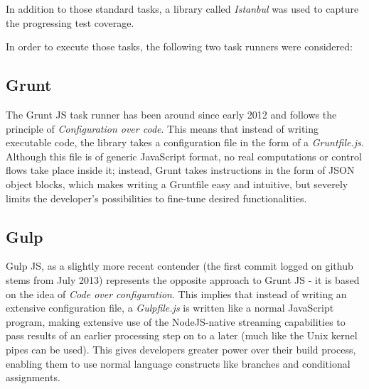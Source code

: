 	In addition to those standard tasks, a library called \textit{Istanbul} was used to capture the progressing test coverage.
	
	In order to execute those tasks, the following two task runners were considered:

	\subsection{Grunt}
	\label{ssect:grunt}
	
	The	Grunt JS task runner has been around since early 2012 and follows the principle of \textit{Configuration over code}. This means that instead of writing executable code, the library takes a configuration file in the form of a \textit{Gruntfile.js}. Although this file is of generic JavaScript format, no real computations or control flows take place inside it; instead, Grunt takes instructions in the form of JSON object blocks, which makes writing a Gruntfile easy and intuitive, but severely limits the developer's possibilities to fine-tune desired functionalities.
	
	\subsection{Gulp}
	\label{ssect:gulp}
	
	Gulp JS, as a slightly more recent contender (the first commit logged on github stems from July 2013) represents the opposite approach to Grunt JS - it is based on the idea of \textit{Code over configuration}. This implies that instead of writing an extensive configuration file, a \textit{Gulpfile.js} is written like a normal JavaScript program, making extensive use of the NodeJS-native streaming capabilities to pass results of an earlier processing step on to a later (much like the Unix kernel pipes can be used). This gives developers greater power over their build process, enabling them to use normal language constructs like branches and conditional assignments.		
	
